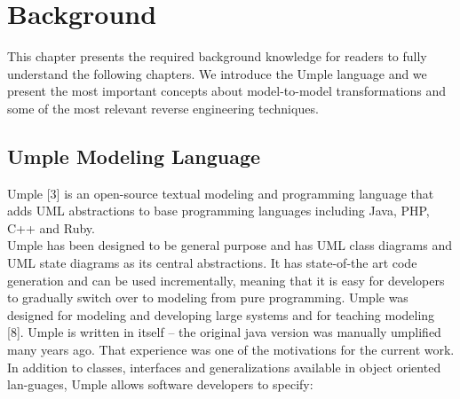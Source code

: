 \lhead{\emph{\leftmark}}  %
\chapter{Background}

This chapter presents the required background knowledge for readers to fully understand the following chapters. We introduce the Umple language and we present the most important concepts about model-to-model transformations and some of the most relevant reverse engineering techniques. 
\section{Umple Modeling Language}

Umple [3] is an open-source textual modeling and programming language that adds UML abstractions to base programming languages including Java, PHP, C++ and Ruby.\\
Umple has been designed to be general purpose and has UML class diagrams and UML state diagrams as its central abstractions. It has state-of-the art code generation and can be used incrementally, meaning that it is easy for developers to gradually switch over to modeling from pure programming. Umple was designed for modeling and developing large systems and for teaching modeling [8]. Umple is written in itself – the original java version was manually umplified many years ago. That experience was one of the motivations for the current work.
In addition to classes, interfaces and generalizations available in object oriented lan-guages, Umple allows software developers to specify:\\
